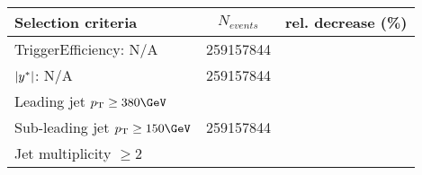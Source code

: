 \begin{table}[htbp]
	\centering
	\begin{tabular}{l|c|c}
		\hline\hline
		Selection criteria & $N_{events}$ & rel. decrease (\%) \\
		\hline
		TriggerEfficiency: N/A & 259157844 &\\
		$|y^\ast|$: N/A        & 259157844 &\\
		Leading jet $\pT \ge 380\GeV$ & &\\
		Sub-leading jet $\pT \ge 150\GeV$ & 259157844 &\\
		Jet multiplicity $\ge 2$ & &\\
		\hline\hline
	\end{tabular}
\end{table}





